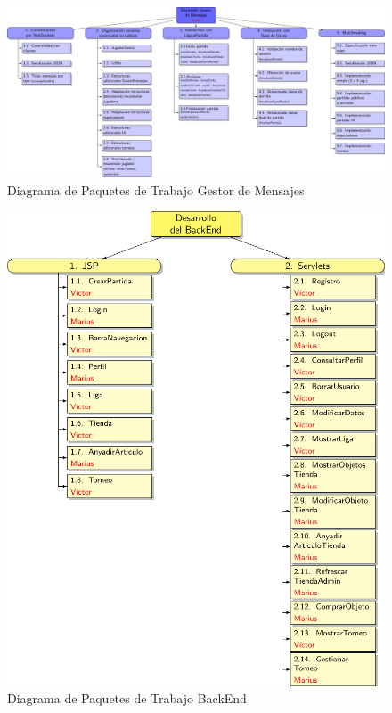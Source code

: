 \begin{figure}[H]
		\hspace{-2cm}
		\includegraphics[scale=0.55]{figuras/edtGestorMensajes.pdf}
		\caption{Diagrama de Paquetes de Trabajo Gestor de Mensajes}
	\end{figure}


\begin{figure}[H]
		\centering
		\includegraphics[scale=0.8]{figuras/edtBackend.pdf}
		\caption{Diagrama de Paquetes de Trabajo BackEnd}
	\end{figure}

